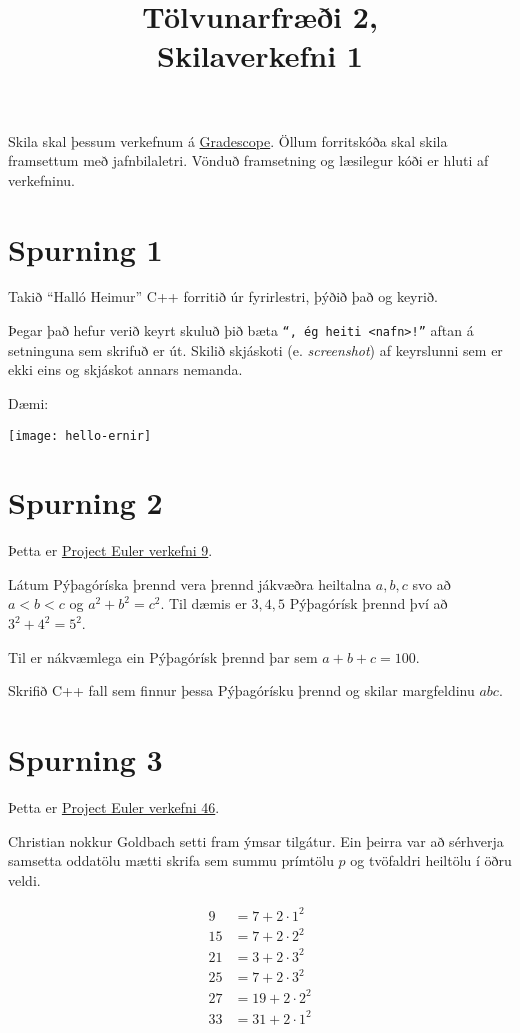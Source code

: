 \documentclass{article}
\title{Tölvunarfræði 2, \semester \\ Skilaverkefni 1}
\author{}
\begin{document}
\maketitle
{}

Skila skal þessum verkefnum á \href{https://gradescope.com/courses/5640}{Gradescope}. Öllum forritskóða skal skila framsettum með jafnbilaletri. Vönduð framsetning og læsilegur kóði er hluti af verkefninu.

\section{Spurning 1}
Takið ``Halló Heimur'' C++ forritið úr fyrirlestri, þýðið það og keyrið.

Þegar það hefur verið keyrt skuluð þið bæta \texttt{``, ég heiti <nafn>!''} aftan á setninguna sem skrifuð er út. Skilið skjáskoti (e. \emph{screenshot}) af keyrslunni sem er ekki eins og skjáskot annars nemanda.

Dæmi:
\begin{center}
\texttt{[image: hello-ernir]}
\end{center}


\section{Spurning 2}
Þetta er \href{https://projecteuler.net/problem=9}{Project Euler verkefni 9}.

Látum Pýþagóríska þrennd vera þrennd jákvæðra heiltalna $a,b,c$ svo að $a < b < c$ og $a^2 + b^2 = c^2$. Til dæmis er $3,4,5$ Pýþagórísk þrennd því að $3^2 + 4^2 = 5^2$.

Til er nákvæmlega ein Pýþagórísk þrennd þar sem $a + b + c = 100$.

Skrifið C++ fall sem finnur þessa Pýþagórísku þrennd og skilar margfeldinu $abc$.

\newpage

\section{Spurning 3}
Þetta er \href{https://projecteuler.net/problem=46}{Project Euler verkefni 46}.

Christian nokkur Goldbach setti fram ýmsar tilgátur. Ein þeirra var að sérhverja samsetta oddatölu mætti skrifa sem summu prímtölu $p$ og tvöfaldri heiltölu í öðru veldi.

\begin{align*}
9 &= 7 + 2\cdot1^2\\
15 &= 7 + 2\cdot2^2\\
21 &= 3 + 2\cdot3^2\\
25 &= 7 + 2\cdot3^2\\
27 &= 19 + 2\cdot2^2\\
33 &= 31 + 2\cdot1^2\\
\end{align*}
\end{document}
